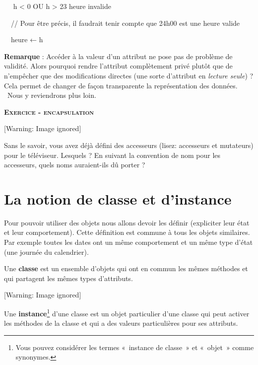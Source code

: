 {\sffamily
\ \  h {\textless} 0 OU h {\textgreater} 23
  {\textquotedbl}heure
invalide{\textquotedbl} \textbf{
}}

{\sffamily
\ \ // Pour être précis, il faudrait tenir compte que 24h00 est une
heure valide}

{\sffamily
\ \ heure ← h}

{\sffamily
{}\textbf{ }}

{
\textbf{Remarque} : Accéder à la valeur d’un attribut ne pose pas de
problème de validité. Alors pourquoi rendre l’attribut complètement
privé plutôt que de n’empêcher que des modifications directes (une
sorte d’attribut en \textit{lecture seule}) ? Cela permet de changer de
façon transparente la représentation des données. \ Nous y reviendrons
plus loin.}

{\sffamily\bfseries\scshape
Exercice - encapsulation}

\begin{center}
 [Warning: Image ignored] %

\end{center}
{
Sans le savoir, vous avez déjà défini des accesseurs (lisez: accesseurs
et mutateurs) pour le téléviseur. Lesquels ? En suivant la convention
de nom pour les accesseurs, quels noms auraient-ils dû porter ?}

\section[La notion de classe et d'instance]{La notion
de classe et d'instance}
{
Pour pouvoir utiliser des objets nous allons devoir les définir
(expliciter leur état et leur comportement). Cette définition est
commune à tous les objets similaires. Par exemple toutes les dates ont
un même comportement et un même type d'état (une
journée du calendrier).}

{
Une \textbf{classe} est un ensemble d'objets qui ont en
commun les mêmes méthodes et qui partagent les mêmes types
d'attributs.}

\begin{center}
 [Warning: Image ignored] %

\end{center}
{
Une \textbf{instance}\footnote{Vous pouvez considérer les termes
«~instance de classe~» et «~objet~» comme synonymes. }
d'une classe est un objet particulier
d'une classe qui peut activer les méthodes de la
classe et qui a des valeurs particulières pour ses attributs.}

